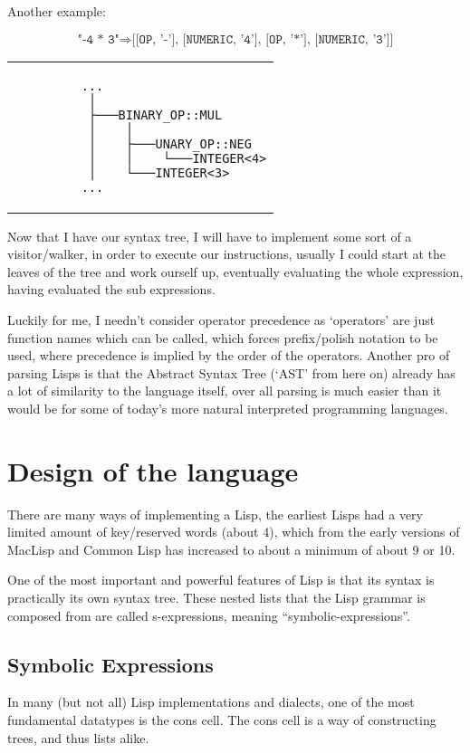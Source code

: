 \documentclass{article}
\newcommand{\code}[1]{\texttt{#1}}
\begin{document}
    \centerline{Another example:}
    \[ \code{"-4 * 3"} \Rightarrow \code{[[OP, '-'], [NUMERIC, '4'], [OP, '*'],
[NUMERIC, '3']]}  \]
    \begin{center}
      \begin{tabular}{l}
        \begin{BVerbatim}
         ...
          │
          ├───BINARY_OP::MUL
          │    │
          │    ├───UNARY_OP::NEG
          │    │    └───INTEGER<4>
          │    └───INTEGER<3>
         ...
       \end{BVerbatim}
      \end{tabular}
    \end{center}


    Now that I have our syntax tree, I will have to implement some sort of a
    visitor/walker, in order to execute our instructions, usually I could start
    at the leaves of the tree and work ourself up, eventually evaluating the whole
    expression, having evaluated the sub expressions.

    Luckily for me, I needn't consider operator precedence as `operators' are
    just function names which can be called, which forces prefix/polish notation
    to be used, where precedence is implied by the order of the operators. Another
    pro of parsing Lisps is that the Abstract Syntax Tree (`AST' from here on)
    already has a lot of similarity to the language itself, over all parsing is
    much easier than it would be for some of today's more natural interpreted
    programming languages.


\section{Design of the language}
  There are many ways of implementing a Lisp, the earliest Lisps had a very
  limited amount of key/reserved words (about 4), which from the early versions
  of MacLisp and Common Lisp has increased to about a minimum of about 9 or 10.

  One of the most important and powerful features of Lisp is that its
  syntax is practically its own syntax tree.  These nested lists that the Lisp
  grammar is composed from are called s-expressions\autocite{sexp}, meaning
  ``symbolic-expressions''.
  \subsection{Symbolic Expressions}
    In many (but not all) Lisp implementations and dialects, one of the most
    fundamental datatypes is the cons cell.  The cons cell is a way of constructing
    trees, and thus lists alike.
\end{document}
